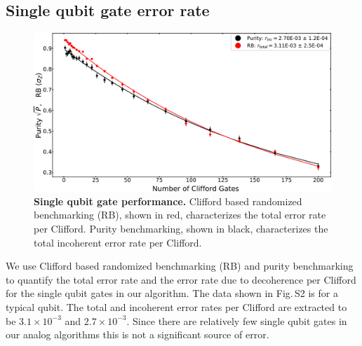 \subsection{Single qubit gate error rate}
\begin{figure}
\centering
\includegraphics[width=140mm, keepaspectratio]{./PDF/RB_supp_190530_1105a.pdf}
\caption{\textbf{Single qubit gate performance.}  Clifford based randomized benchmarking (RB), shown in red, characterizes the total error rate per Clifford.  Purity benchmarking, shown in black, characterizes the total incoherent error rate per Clifford.}
\end{figure}
We use Clifford based randomized benchmarking (RB) and purity benchmarking to quantify the total error rate and the error rate due to decoherence per Clifford for the single qubit gates in our algorithm.
The data shown in Fig.\,S2 is for a typical qubit.  The total and incoherent error rates per Clifford are extracted to be $3.1 \times 10^{-3}$ and $2.7 \times 10^{-3}$.
Since there are relatively few single qubit gates in our analog algorithms this is not a significant source of error.

